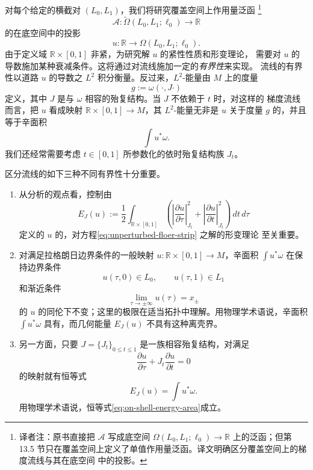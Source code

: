 对每个给定的横截对 $(L_0,L_1)$，我们将研究覆盖空间上作用量泛函
\footnote{译者注：原书直接把 $\mathcal A$ 写成底空间
$\Omega(L_0,L_1;\ell_0)\to\mathbb R$ 上的泛函；但第 13.5 节只在\personNovikov{}覆盖空间上定义了单值作用量泛函。译文明确区分覆盖空间上的梯度流线与其在底空间
中的投影。}
\[
  \mathcal A:\widetilde\Omega(L_0,L_1;\ell_0)\longrightarrow\mathbb R
\]
的\emph{\termBoundedGradientTrajectory{}}在底空间中的投影
\[
  u:\mathbb R\longrightarrow\Omega(L_0,L_1;\ell_0).
\]
由于定义域 $\mathbb R\times[0,1]$ 非紧，为研究解 $u$ 的紧性性质和形变理论，
需要对 $u$ 的导数施加某种衰减条件。这将通过对流线施加一定的\emph{有界性}来实现。
流线的有界性以道路 $u$ 的导数之 $L^2$ 积分衡量。反过来，$L^2$-能量由 $M$ 上的\personRiemann{}度量
\[
  g:=\omega(\mathord\cdot,J\mathord\cdot)
\]
定义，其中 $J$ 是与 $\omega$ 相容的殆复结构。当 $J$ 不依赖于 $t$ 时，对这样的
梯度流线而言，把 $u$ 看成映射 $\mathbb R\times[0,1]\to M$，其 $L^2$-能量无非是
$u$ 关于度量 $g$ 的\termHarmonicEnergy{}，并且等于辛面积
\[
  \int u^*\omega.
\]
我们还经常需要考虑 $t\in[0,1]$ 所参数化的依时殆复结构族 $J_t$。

区分流线的如下三种不同有界性十分重要。
\begin{enumerate}[label=(\arabic*)]
  \item 从分析的观点看，控制由
  \[
    E_J(u)
    :=
    \frac12\int_{\mathbb R\times[0,1]}
      \left(
        \left|\frac{\partial u}{\partial\tau}\right|_{J_t}^2
        +
        \left|\frac{\partial u}{\partial t}\right|_{J_t}^2
      \right)\,dt\,d\tau
  \]
  定义的 $u$ 的\termGeometricEnergy{}，对方程\eqref{eq:unperturbed-floer-strip}
  之解的形变理论
  至关重要。

  \item 对满足拉格朗日边界条件的一般映射
  $u:\mathbb R\times[0,1]\to M$，辛面积 $\int u^*\omega$ 在保持边界条件
  \begin{equation}
    u(\tau,0)\in L_0,
    \qquad
    u(\tau,1)\in L_1
  \label{eq:strip-lagrangian-boundary}
  \end{equation}
  和渐近条件
  \begin{equation}
    \lim_{\tau\to\pm\infty}u(\tau)=x_\pm
  \label{eq:strip-asymptotic-points}
  \end{equation}
  的 $u$ 的同伦下不变；这里的极限在适当拓扑中理解。用物理学术语说，辛面积
  $\int u^*\omega$ 具有\emph{\termOffShellBound{}}，而几何能量 $E_J(u)$ 不具有这种离壳界。

  \item 另一方面，只要 $J=\{J_t\}_{0\leq t\leq1}$ 是一族相容殆复结构，对满足
  \[
    \frac{\partial u}{\partial\tau}
    +J_t\frac{\partial u}{\partial t}=0
  \]
  的映射就有恒等式
  \begin{equation}
    E_J(u)=\int u^*\omega.
  \label{eq:on-shell-energy-area}
  \end{equation}
  用物理学术语说，恒等式\eqref{eq:on-shell-energy-area}\emph{\termOnShell{}}成立。
\end{enumerate}

